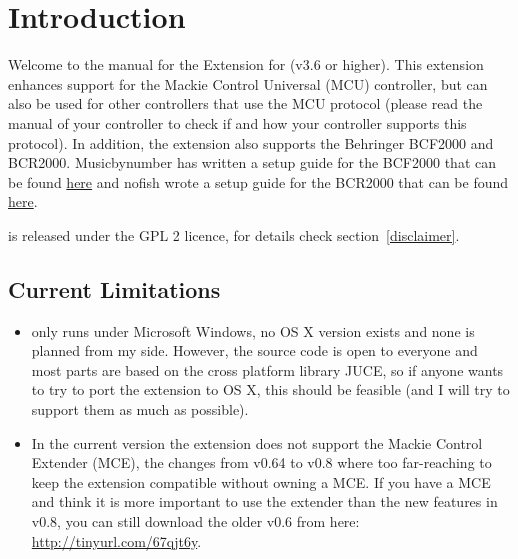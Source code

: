 \section{Introduction}

Welcome to the manual for the \mcu Extension for \reaper (v3.6 or
higher). This extension enhances support for the Mackie Control
Universal (MCU) controller, but can also be used for other controllers
that use the MCU protocol (please read the manual of your
controller to check if and how your controller supports this
protocol). In addition, the extension also supports the Behringer
BCF2000 and BCR2000. Musicbynumber has written a setup guide for the
BCF2000 that can be found
\href{http://forum.cockos.com/showpost.php?p=473466&postcount=127}{here}
and nofish wrote a setup guide for the BCR2000 that can be found
\href{http://forum.cockos.com/showthread.php?t=60110}{here}.

\mcu is released under the GPL 2 licence, for details check
section~\ref{disclaimer}.

\subsection{Current Limitations}
\begin{itemize}
\item \mcu only runs under Microsoft Windows, no OS X version exists
  and none is planned from my side. However, the source code is open to
  everyone and most parts are based on the cross platform library
  JUCE, so if anyone wants to try to port the extension to OS X, this
  should be feasible (and I will try to support them as much as
  possible).

\item In the current version the extension does not support the Mackie
  Control Extender (MCE), the changes from v0.64 to v0.8 where too
  far-reaching to keep the extension compatible without owning a
  MCE. 
  If you have a MCE and think
  it is more important to use the extender than the new features in
  v0.8, you can still download the older v0.6 from here:
  \url{http://tinyurl.com/67qjt6y}.

\end{itemize}

% 

